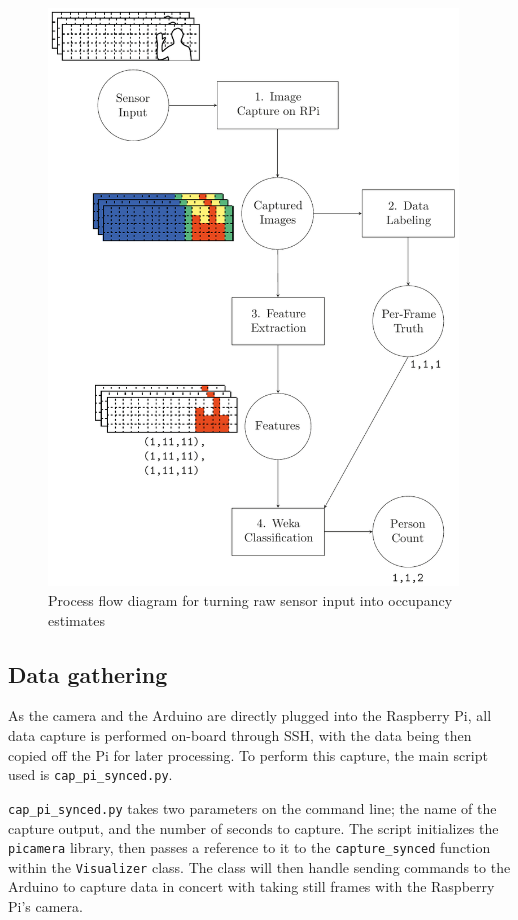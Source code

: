 \documentclass[../thesis/thesis.tex]{subfiles}
\begin{document}
\begin{figure}
\centering
\includegraphics[width=0.97\textwidth]{../diagrams/process-pics.pdf}
\caption{Process flow diagram for turning raw sensor input into occupancy estimates}
\label{fig:methods:flowchart}
\end{figure}

\subsection{Data gathering}
As the camera and the Arduino are directly plugged into the Raspberry Pi, all data capture is performed on-board through SSH, with the data being then copied off the Pi for later processing. To perform this capture, the main script used is \texttt{cap\_pi\_synced.py}.

\texttt{cap\_pi\_synced.py} takes two parameters on the command line; the name of the capture output, and the number of seconds to capture. The script initializes the \texttt{picamera} library, then passes a reference to it to the \texttt{capture\_synced} function within the \texttt{Visualizer} class. The class will then handle sending commands to the Arduino to capture data in concert with taking still frames with the Raspberry Pi's camera.
\end{document}
